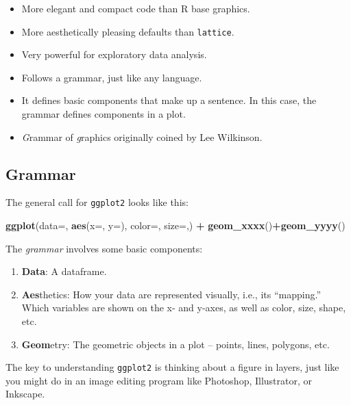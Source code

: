 \documentclass[]{book}
\newenvironment{Shaded}{\begin{snugshade}}{\end{snugshade}}
\newcommand{\KeywordTok}[1]{\textcolor[rgb]{0.13,0.29,0.53}{\textbf{#1}}}
\newcommand{\DataTypeTok}[1]{\textcolor[rgb]{0.13,0.29,0.53}{#1}}
\newcommand{\StringTok}[1]{\textcolor[rgb]{0.31,0.60,0.02}{#1}}
\newcommand{\OperatorTok}[1]{\textcolor[rgb]{0.81,0.36,0.00}{\textbf{#1}}}
\newcommand{\NormalTok}[1]{#1}
\providecommand{\tightlist}{%
  \setlength{\itemsep}{0pt}\setlength{\parskip}{0pt}}
\begin{document}
\begin{itemize}
\tightlist
\item
  More elegant and compact code than R base graphics.
\item
  More aesthetically pleasing defaults than \texttt{lattice}.
\item
  Very powerful for exploratory data analysis.
\item
  Follows a grammar, just like any language.
\item
  It defines basic components that make up a sentence. In this case, the
  grammar defines components in a plot.
\item
  \emph{G}rammar of \emph{g}raphics originally coined by Lee Wilkinson.
\end{itemize}

\subsection{Grammar}\label{grammar}

The general call for \texttt{ggplot2} looks like this:

\begin{Shaded}
\begin{Highlighting}[]
\KeywordTok{ggplot}\NormalTok{(}\DataTypeTok{data=}\NormalTok{, }\KeywordTok{aes}\NormalTok{(}\DataTypeTok{x=}\NormalTok{, }\DataTypeTok{y=}\NormalTok{), }\DataTypeTok{color=}\NormalTok{, }\DataTypeTok{size=}\NormalTok{,) }\OperatorTok{+}\StringTok{ }\KeywordTok{geom_xxxx}\NormalTok{()}\OperatorTok{+}\KeywordTok{geom_yyyy}\NormalTok{()}
\end{Highlighting}
\end{Shaded}

The \emph{grammar} involves some basic components:

\begin{enumerate}
\def\labelenumi{\arabic{enumi}.}
\tightlist
\item
  \textbf{Data}: A dataframe.
\item
  \textbf{Aes}thetics: How your data are represented visually, i.e., its
  ``mapping.'' Which variables are shown on the x- and y-axes, as well
  as color, size, shape, etc.
\item
  \textbf{Geom}etry: The geometric objects in a plot -- points, lines,
  polygons, etc.
\end{enumerate}

The key to understanding \texttt{ggplot2} is thinking about a figure in
layers, just like you might do in an image editing program like
Photoshop, Illustrator, or Inkscape.
\end{document}
